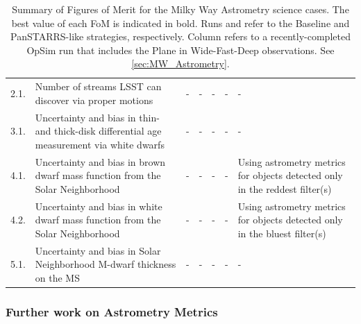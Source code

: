 \begin{table}
\begin{tabular}{l|p{4.8cm}|p{1.1cm}|p{1.1cm}|p{1.1cm}|c|p{3.5cm}}
    \hline
    2.1. & \footnotesize{Number of streams LSST can discover via proper motions} & - & - & - & - &  - \\
    3.1. & \footnotesize{Uncertainty and bias in thin- and thick-disk differential age measurement via white dwarfs} & - & - & - & - &  - \\
    4.1. & \footnotesize{Uncertainty and bias in brown dwarf mass function from the Solar Neighborhood}  & - & - & - & - & \footnotesize{Using astrometry metrics for objects detected only in the reddest filter(s)} \\
    4.2. & \footnotesize{Uncertainty and bias in white dwarf mass function from the Solar Neighborhood}  & - & - & - & - & \footnotesize{Using astrometry metrics for objects detected only in the bluest filter(s)} \\
    5.1. & \footnotesize{Uncertainty and bias in Solar Neighborhood M-dwarf thickness on the MS}  & - & - & - & - &  - \\
\end{tabular}
\caption{Summary of Figures of Merit for the Milky Way Astrometry science cases. The best value of each FoM is indicated in bold. Runs  and  refer to the Baseline and PanSTARRS-like strategies, respectively. Column  refers to a recently-completed OpSim run that includes the Plane in Wide-Fast-Deep observations. See \autoref{sec:MW_Astrometry}.}
\label{tab_SummaryMWAstrometry}
\end{table}




\subsubsection{Further work on Astrometry Metrics}

